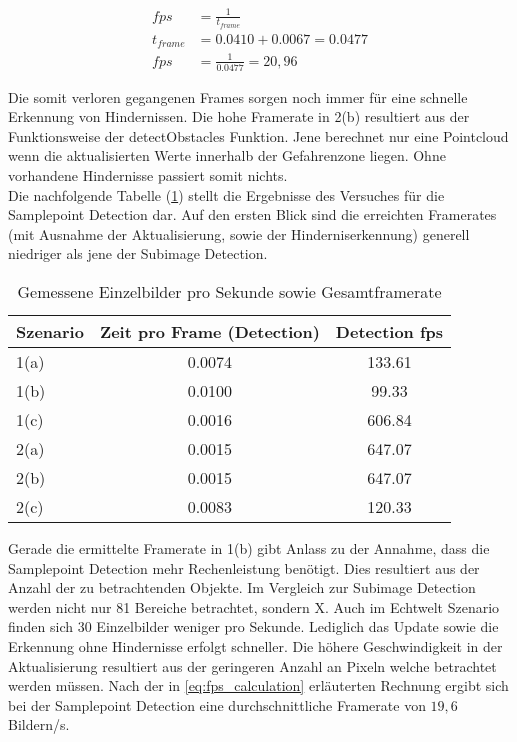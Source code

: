 \begin{equation}
\label{eq:fps_calculation}
\begin{aligned}
	fps &= \frac{1}{t_{frame}}\\
	t_{frame} &= 0.0410 + 0.0067 = 0.0477\\
	fps &= \frac{1}{0.0477} = 20,96
\end{aligned}
\end{equation}

\noindent
Die somit verloren gegangenen Frames sorgen noch immer für eine schnelle Erkennung von Hindernissen. Die hohe Framerate in 2(b) resultiert aus der Funktionsweise der detectObstacles Funktion. Jene berechnet nur eine Pointcloud wenn die aktualisierten Werte innerhalb der Gefahrenzone liegen. Ohne vorhandene Hindernisse passiert somit nichts.\\

\noindent
Die nachfolgende Tabelle (\ref{tbl:samplepoint_framerate}) stellt die Ergebnisse des Versuches für die Samplepoint Detection dar. Auf den ersten Blick sind die erreichten Framerates (mit Ausnahme der Aktualisierung, sowie der Hinderniserkennung) generell niedriger als jene der Subimage Detection. 

\begin{table}[h]
\centering
\begin{tabular}{|l|c|c|}
\hline
Szenario & Zeit pro Frame (Detection) & Detection fps \\ \hline\hline
1(a)     & 0.0074           			  & 133.61         \\ \hline
1(b)     & 0.0100           			  & 99.33          \\ \hline
1(c)     & 0.0016           			  & 606.84         \\ \hline\hline
2(a)     & 0.0015           			  & 647.07         \\ \hline
2(b)     & 0.0015           		  	  & 647.07         \\ \hline
2(c)     & 0.0083           	 		  & 120.33         \\ \hline
\end{tabular}
\caption{Gemessene Einzelbilder pro Sekunde sowie Gesamtframerate}
\label{tbl:samplepoint_framerate}
\end{table}

\noindent
Gerade die ermittelte Framerate in 1(b) gibt Anlass zu der Annahme, dass die Samplepoint Detection mehr Rechenleistung benötigt. Dies resultiert aus der Anzahl der zu betrachtenden Objekte. Im Vergleich zur Subimage Detection werden nicht nur 81 Bereiche betrachtet, sondern X. Auch im Echtwelt Szenario finden sich 30 Einzelbilder weniger pro Sekunde. Lediglich das Update sowie die Erkennung ohne Hindernisse erfolgt schneller. Die höhere Geschwindigkeit in der Aktualisierung resultiert aus der geringeren Anzahl an Pixeln welche betrachtet werden müssen. Nach der in \ref{eq:fps_calculation} erläuterten Rechnung ergibt sich bei der Samplepoint Detection eine durchschnittliche Framerate von $19,6$ Bildern/s.

